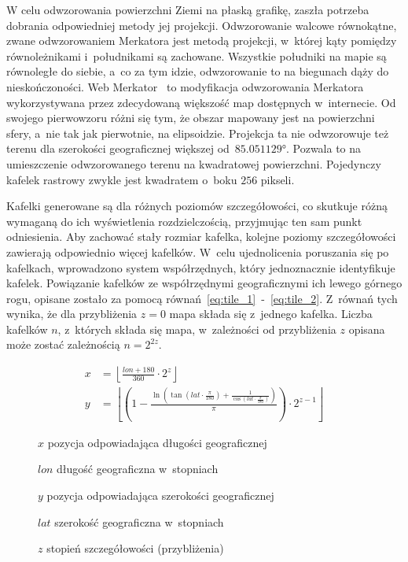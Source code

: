 W celu odwzorowania powierzchni Ziemi na płaską grafikę, zaszła potrzeba dobrania odpowiedniej metody jej projekcji. Odwzorowanie walcowe równokątne, zwane odwzorowaniem Merkatora jest metodą projekcji, w~której kąty pomiędzy równoleżnikami i~południkami są zachowane. Wszystkie południki na mapie są równoległe do siebie, a~co za tym idzie, odwzorowanie to na biegunach dąży do nieskończoności. Web Merkator~\cite{Mercator} to modyfikacja odwzorowania Merkatora wykorzystywana przez zdecydowaną większość map dostępnych w~internecie. Od swojego pierwowzoru różni się tym, że obszar mapowany jest na powierzchni sfery, a~nie tak jak pierwotnie, na elipsoidzie. Projekcja ta nie odwzorowuje też terenu dla szerokości geograficznej większej od~$\ang{85,051129}$. Pozwala to na umieszczenie odwzorowanego terenu na kwadratowej powierzchni. Pojedynczy kafelek rastrowy zwykle jest kwadratem o~boku $256$ pikseli.

Kafelki generowane są dla różnych poziomów szczegółowości, co skutkuje różną wymaganą do ich wyświetlenia rozdzielczością, przyjmując ten sam punkt odniesienia. Aby zachować stały rozmiar kafelka, kolejne poziomy szczegółowości zawierają odpowiednio więcej kafelków. W~celu ujednolicenia poruszania się po kafelkach, wprowadzono system współrzędnych, który jednoznacznie identyfikuje kafelek. Powiązanie kafelków ze współrzędnymi geograficznymi ich lewego górnego rogu, opisane zostało za pomocą równań~\ref{eq:tile_1}~-~\ref{eq:tile_2}. Z~równań tych wynika, że dla przybliżenia $z = 0$ mapa składa się z~jednego kafelka. Liczba kafelków $n$, z~których składa się mapa, w~zależności od przybliżenia $z$ opisana może zostać zależnością $n = 2^{2z}$.

\begin{samepage}
  \begin{figure}[h]
  \begin{align}
      \label{eq:tile_1}
      x &= \left\lfloor \frac{lon + 180}{360} \cdot 2^z \right\rfloor \\
      \label{eq:tile_2}
      y &=
          \left\lfloor
              \left(
                  1 - \frac{
                      \ln \left(
                          \tan \left(
                              lat \cdot \frac{\pi}{180}
                          \right) + \frac{1}{\cos \left( lat \cdot \frac{\pi}{180} \right)}
                      \right)
                  }{\pi}
              \right) \cdot 2^{z - 1}
          \right\rfloor
  \end{align}
  \begin{eqexpl}[25mm]
      \item {$x$} pozycja odpowiadająca długości geograficznej
      \item {$lon$} długość geograficzna w~stopniach
      \item {$y$} pozycja odpowiadająca szerokości geograficznej
      \item {$lat$} szerokość geograficzna w~stopniach
      \item {$z$} stopień szczegółowości (przybliżenia)
  \end{eqexpl}
  \vspace{\baselineskip}
\end{figure}
\end{samepage}


